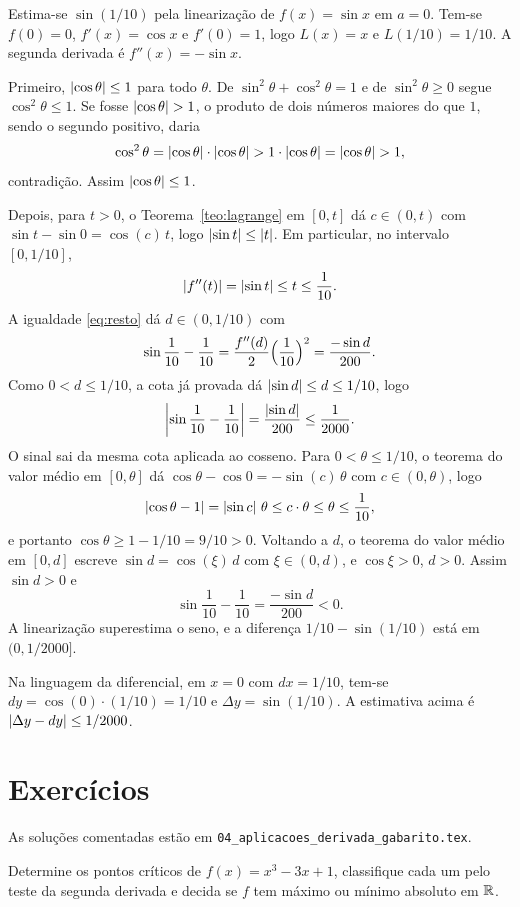 \documentclass[11pt,a4paper]{article}
\begin{document}
\begin{exemplo}
Estima-se $\sin(1/10)$ pela linearização de $f(x)=\sin x$ em $a=0$. Tem-se $f(0)=0$, $f'(x)=\cos x$ e $f'(0)=1$, logo $L(x)=x$ e $L(1/10)=1/10$. A segunda derivada é $f''(x)=-\sin x$.

Primeiro, $\left\lvert \cos\theta \right\rvert\le 1$ para todo $\theta$. De $\sin^2\theta+\cos^2\theta=1$ e de $\sin^2\theta\ge 0$ segue $\cos^2\theta\le 1$. Se fosse $\left\lvert \cos\theta \right\rvert>1$, o produto de dois números maiores do que $1$, sendo o segundo positivo, daria
\[
\cos^2\theta=\left\lvert \cos\theta \right\rvert\cdot\left\lvert \cos\theta \right\rvert>1\cdot\left\lvert \cos\theta \right\rvert=\left\lvert \cos\theta \right\rvert>1,
\]
contradição. Assim $\left\lvert \cos\theta \right\rvert\le 1$.

Depois, para $t>0$, o Teorema~\ref{teo:lagrange} em $[0,t]$ dá $c\in(0,t)$ com $\sin t-\sin 0=\cos(c)\,t$, logo $\left\lvert \sin t \right\rvert\le\left\lvert t \right\rvert$. Em particular, no intervalo $[0,1/10]$,
\[
\left\lvert f''(t) \right\rvert=\left\lvert \sin t \right\rvert\le t\le\frac{1}{10}.
\]
A igualdade \eqref{eq:resto} dá $d\in(0,1/10)$ com
\[
\sin\frac{1}{10}-\frac{1}{10}
=\frac{f''(d)}{2}\Bigl(\frac{1}{10}\Bigr)^2
=\frac{-\sin d}{200}.
\]
Como $0<d\le 1/10$, a cota já provada dá $\left\lvert \sin d \right\rvert\le d\le 1/10$, logo
\[
\left\lvert \sin\frac{1}{10}-\frac{1}{10} \right\rvert
=\frac{\left\lvert \sin d \right\rvert}{200}
\le\frac{1}{2000}.
\]
O sinal sai da mesma cota aplicada ao cosseno. Para $0<\theta\le 1/10$, o teorema do valor médio em $[0,\theta]$ dá $\cos\theta-\cos 0=-\sin(c)\,\theta$ com $c\in(0,\theta)$, logo
\[
\left\lvert \cos\theta-1 \right\rvert=\left\lvert \sin c \right\rvert\,\theta\le c\cdot\theta\le\theta\le\frac{1}{10},
\]
e portanto $\cos\theta\ge 1-1/10=9/10>0$. Voltando a $d$, o teorema do valor médio em $[0,d]$ escreve $\sin d=\cos(\xi)\,d$ com $\xi\in(0,d)$, e $\cos\xi>0$, $d>0$. Assim $\sin d>0$ e
\[
\sin\frac{1}{10}-\frac{1}{10}=\frac{-\sin d}{200}<0.
\]
A linearização superestima o seno, e a diferença $1/10-\sin(1/10)$ está em $(0,1/2000]$.

Na linguagem da diferencial, em $x=0$ com $dx=1/10$, tem-se $dy=\cos(0)\cdot(1/10)=1/10$ e $\Delta y=\sin(1/10)$. A estimativa acima é $\left\lvert \Delta y-dy \right\rvert\le 1/2000$.
\end{exemplo}

\section{Exercícios}

As soluções comentadas estão em \texttt{04\_aplicacoes\_derivada\_gabarito.tex}.

\begin{exercicio}
Determine os pontos críticos de $f(x)=x^3-3x+1$, classifique cada um pelo teste da segunda derivada e decida se $f$ tem máximo ou mínimo absoluto em $\mathbb{R}$.
\end{exercicio}
\end{document}
